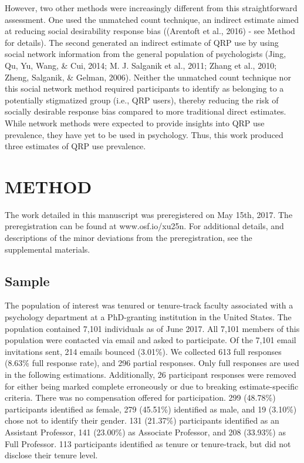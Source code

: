 \documentclass[jou]{apa6}
\theoremstyle{definition}
\theoremstyle{definition}
\theoremstyle{definition}
\theoremstyle{remark}
\begin{document}
However, two other methods were increasingly different from this
straightforward assessment. One used the unmatched count technique, an
indirect estimate aimed at reducing social desirability response bias
((Arentoft et al., 2016) - see Method for details). The second generated
an indirect estimate of QRP use by using social network information from
the general population of psychologists (Jing, Qu, Yu, Wang, \& Cui,
2014; M. J. Salganik et al., 2011; Zhang et al., 2010; Zheng, Salganik,
\& Gelman, 2006). Neither the unmatched count technique nor this social
network method required participants to identify as belonging to a
potentially stigmatized group (i.e., QRP users), thereby reducing the
risk of socially desirable response bias compared to more traditional
direct estimates. While network methods were expected to provide
insights into QRP use prevalence, they have yet to be used in
psychology. Thus, this work produced three estimates of QRP use
prevalence.

\section{METHOD}\label{method}

The work detailed in this manuscript was preregistered on May 15th,
2017. The preregistration can be found at www.osf.io/xu25n. For
additional details, and descriptions of the minor deviations from the
preregistration, see the supplemental materials.

\subsection{Sample}\label{sample}

The population of interest was tenured or tenure-track faculty
associated with a psychology department at a PhD-granting institution in
the United States. The population contained 7,101 individuals as of June
2017. All 7,101 members of this population were contacted via email and
asked to participate. Of the 7,101 email invitations sent, 214 emails
bounced (3.01\%). We collected 613 full responses (8.63\% full response
rate), and 296 partial responses. Only full responses are used in the
following estimations. Additionally, 26 participant responses were
removed for either being marked complete erroneously or due to breaking
estimate-specific criteria. There was no compensation offered for
participation. 299 (48.78\%) participants identified as female, 279
(45.51\%) identified as male, and 19 (3.10\%) chose not to identify
their gender. 131 (21.37\%) participants identified as an Assistant
Professor, 141 (23.00\%) as Associate Professor, and 208 (33.93\%) as
Full Professor. 113 participants identified as tenure or tenure-track,
but did not disclose their tenure level.
\end{document}
